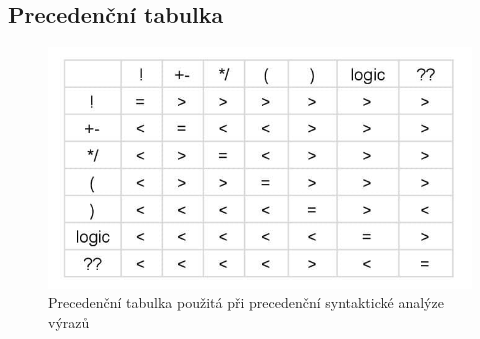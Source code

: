 \documentclass[a4paper, 11pt]{article}
\begin{document}
	\subsection{Precedenční tabulka}
	\begin{figure}[!ht]
		\centering
		\includegraphics[width=0.7\linewidth]{prec_table.png}
		\caption{Precedenční tabulka použitá při precedenční syntaktické analýze výrazů}
		\label{figure:prec_tabulka}
	\end{figure}
\end{document}
